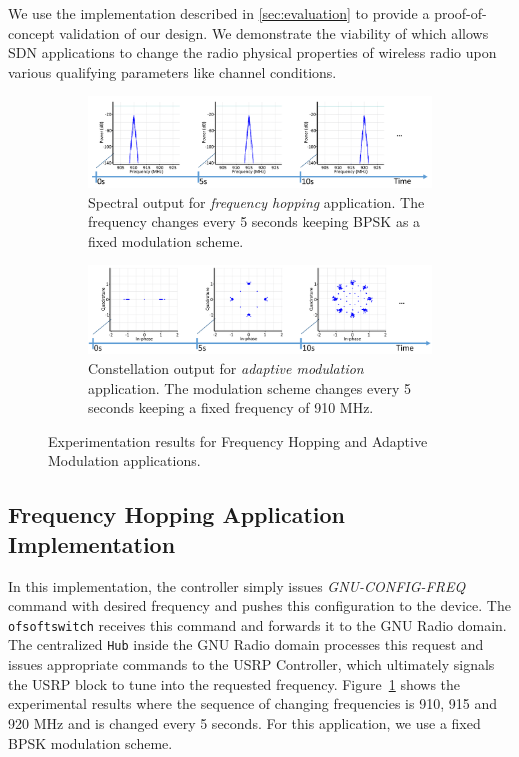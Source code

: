 We use the \crossflow implementation described in \ref{sec:evaluation} to provide a proof-of-concept validation of our design. We demonstrate the viability of \crossflow which  allows SDN applications to change the radio physical properties of wireless radio upon various qualifying parameters like channel conditions. 


\begin{figure}
\centering
  \begin{subfigure}[b]{\textwidth}
        \centering
      \includegraphics[width=1\textwidth]{figures/Freq.pdf}
      \caption{Spectral output for \emph{frequency hopping} application. The frequency changes every 5 seconds keeping BPSK as a fixed modulation scheme.}
      \label{fig:freq}
  \end{subfigure}

  \begin{subfigure}[a]{\textwidth}
  \centering
      \includegraphics[width=1\textwidth]{figures/Mod.pdf}
      \caption{Constellation output for \emph{adaptive modulation} application. The modulation scheme changes every 5 seconds keeping a fixed frequency of 910 MHz.}
      \label{fig:mod}
  \end{subfigure}%
  \caption{Experimentation results for Frequency Hopping and Adaptive Modulation applications.}
\end{figure}


\subsection{Frequency Hopping Application Implementation}

In this implementation,  the controller simply issues \emph{GNU-CONFIG-FREQ} command with desired frequency and pushes this configuration to the device. The \texttt{ofsoftswitch} receives this command and forwards it to the GNU Radio domain. The centralized \texttt{\crossflow Hub} inside the GNU Radio domain processes this request and issues appropriate commands to the  USRP Controller, which ultimately signals the USRP block to tune into the requested frequency. Figure~\ref{fig:freq} shows the experimental results where the sequence of changing frequencies is 910, 915 and 920 MHz and is changed every 5 seconds. For this application, we use a fixed BPSK modulation scheme.


